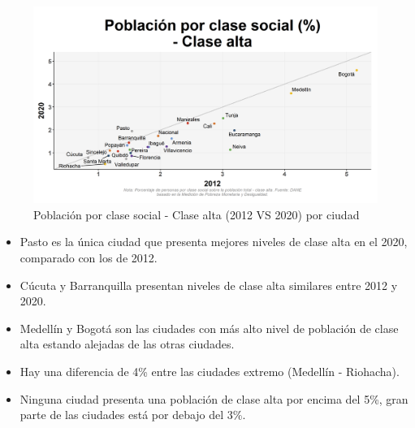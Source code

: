     \begin{figure}[H]
        \caption{Población por clase social - Clase alta (2012 VS 2020) por ciudad \label{map_result_2} }
        \begin{center}
        \includegraphics[width=\textwidth,keepaspectratio]{img/var_250_scatter_time.png}
        \end{center}
    \end{figure}
            \begin{itemize}
                    \item Pasto es la única ciudad que presenta mejores niveles de clase alta en el 2020, comparado con los de 2012.
                    \item Cúcuta y Barranquilla presentan niveles de clase alta similares entre 2012 y 2020.
                    \item Medellín y Bogotá son las ciudades con más alto nivel de población de clase alta estando alejadas de las otras ciudades.
                    \item Hay una diferencia de 4\% entre las ciudades extremo (Medellín - Riohacha).
                    \item Ninguna ciudad presenta una población de clase alta por encima del 5\%, gran parte de las ciudades está por debajo del 3\%.
                    \end{itemize}

